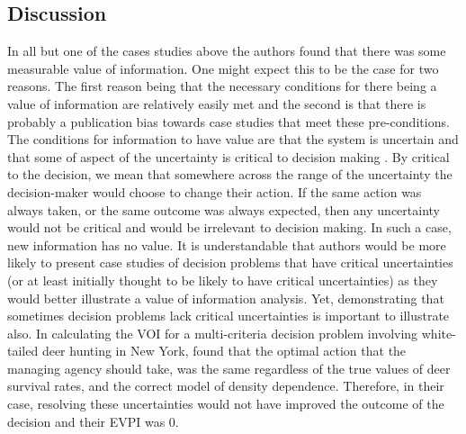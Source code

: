 \documentclass[]{article}
\theoremstyle{definition}
\theoremstyle{definition}
\theoremstyle{definition}
\theoremstyle{remark}
\begin{document}
\subsection*{Discussion}\label{discussion}

In all but one of the cases studies above \citep{Robinson2016} the
authors found that there was some measurable value of information. One
might expect this to be the case for two reasons. The first reason being
that the necessary conditions for there being a value of information are
relatively easily met and the second is that there is probably a
publication bias towards case studies that meet these pre-conditions.
The conditions for information to have value are that the system is
uncertain and that some of aspect of the uncertainty is critical to
decision making \citep{Runge2011a}. By critical to the decision, we mean
that somewhere across the range of the uncertainty the decision-maker
would choose to change their action. If the same action was always
taken, or the same outcome was always expected, then any uncertainty
would not be critical and would be irrelevant to decision making. In
such a case, new information has no value. It is understandable that
authors would be more likely to present case studies of decision
problems that have critical uncertainties (or at least initially thought
to be likely to have critical uncertainties) as they would better
illustrate a value of information analysis. Yet, demonstrating that
sometimes decision problems lack critical uncertainties is important to
illustrate also. In calculating the VOI for a multi-criteria decision
problem involving white-tailed deer hunting in New York,
\citet{Robinson2016} found that the optimal action that the managing
agency should take, was the same regardless of the true values of deer
survival rates, and the correct model of density dependence. Therefore,
in their case, resolving these uncertainties would not have improved the
outcome of the decision and their EVPI was 0.
\end{document}

